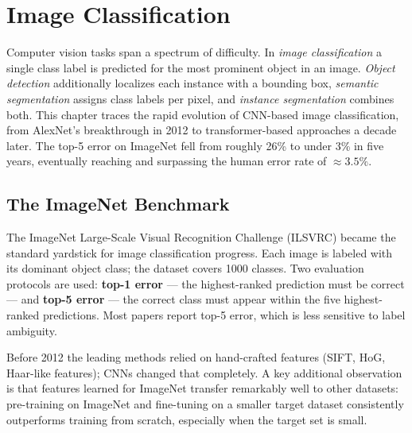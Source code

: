 \documentclass[11pt, oneside]{book}
\begin{document}
\setcounter{tocdepth}{2}

\begingroup
  \let\cleardoublepage\relax
  \let\clearpage\relax
  \tableofcontents
\endgroup

\mainmatter


\chapter{Image Classification}

Computer vision tasks span a spectrum of difficulty.
In \emph{image classification} a single class label is predicted
for the most prominent object in an image.
\emph{Object detection} additionally localizes each instance with a bounding box,
\emph{semantic segmentation} assigns class labels per pixel, and
\emph{instance segmentation} combines both.
This chapter traces the rapid evolution of CNN-based image classification,
from AlexNet's breakthrough in 2012 to transformer-based approaches a decade later.
The top-5 error on ImageNet fell from roughly 26\% to under 3\% in five years,
eventually reaching and surpassing the human error rate of $\approx 3.5\%$.

\section{The ImageNet Benchmark}

The ImageNet Large-Scale Visual Recognition Challenge (ILSVRC) became the
standard yardstick for image classification progress.
Each image is labeled with its dominant object class; the dataset covers 1000 classes.
Two evaluation protocols are used:
\textbf{top-1 error} — the highest-ranked prediction must be correct — and
\textbf{top-5 error} — the correct class must appear within the five highest-ranked predictions.
Most papers report top-5 error, which is less sensitive to label ambiguity.

Before 2012 the leading methods relied on hand-crafted features
(SIFT, HoG, Haar-like features); CNNs changed that completely.
A key additional observation is that features learned for ImageNet
transfer remarkably well to other datasets:
pre-training on ImageNet and fine-tuning on a smaller target dataset
consistently outperforms training from scratch, especially when the target set is small.
\end{document}
